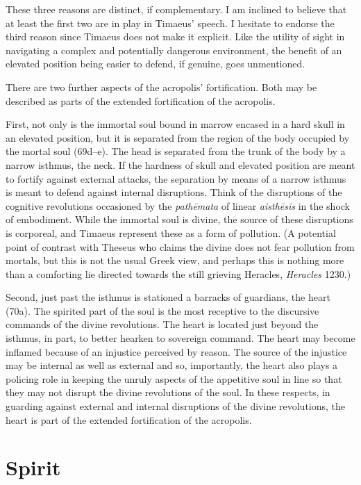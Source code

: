 These three reasons are distinct, if complementary. I am inclined to believe that at least the first two are in play in Timaeus' speech.  I hesitate to endorse the third reason since Timaeus does not make it explicit. Like the utility of sight in navigating a complex and potentially dangerous environment, the benefit of an elevated position being easier to defend, if genuine, goes unmentioned.

There are two further aspects of the acropolis' fortification. Both may be described as parts of the extended fortification of the acropolis.

First, not only is the immortal soul bound in marrow encased in a hard skull in an elevated position, but it is separated from the region of the body occupied by the mortal soul (69d--e). The head is separated from the trunk of the body by a narrow isthmus, the neck. If the hardness of skull and elevated position are meant to fortify against external attacks, the separation by means of a narrow isthmus is meant to defend against internal disruptions. Think of the disruptions of the cognitive revolutions occasioned by the \emph{pathēmata} of linear \emph{aisthēsis} in the shock of embodiment. While the immortal soul is divine, the source of these disruptions is corporeal, and Timaeus represent these as a form of pollution. (A potential point of contrast with Theseus who claims the divine does not fear pollution from mortals, but this is not the usual Greek view, and perhaps this is nothing more than a comforting lie directed towards the still grieving Heracles, \emph{Heracles} 1230.)

Second, just past the isthmus is stationed a barracks of guardians, the heart (70a). The spirited part of the soul is the most receptive to the discursive commands of the divine revolutions. The heart is located just beyond the isthmus, in part, to better hearken to sovereign command. The heart may become inflamed because of an injustice perceived by reason. The source of the injustice may be internal as well as external and so, importantly, the heart also plays a policing role in keeping the unruly aspects of the appetitive soul in line so that they may not disrupt the divine revolutions of the soul. In these respects, in guarding against external and internal disruptions of the divine revolutions, the heart is part of the extended fortification of the acropolis.


\section{Spirit} %
\label{sec:spirit}

